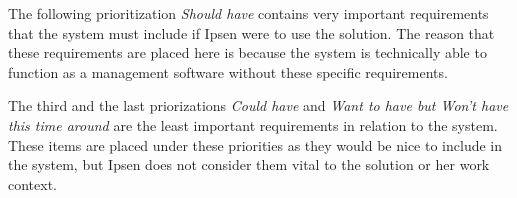 The following prioritization \textit{Should have} contains very important requirements that the system must include if Ipsen were to use the solution.
The reason that these requirements are placed here is because the system is technically able to function as a management software without these specific requirements.

The third and the last priorizations \textit{Could have} and \textit{Want to have but Won't have this time around} are the least important requirements in relation to the system.
These items are placed under these priorities as they would be nice to include in the system, but Ipsen does not consider them vital to the solution or her work context.
